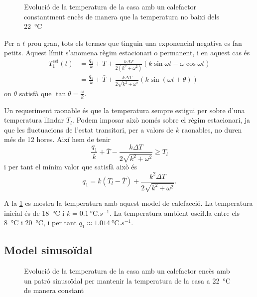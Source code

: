 \documentclass[12pt]{article}
\numberwithin{table}{section}
\numberwithin{figure}{section}
\numberwithin{equation}{section}
\begin{document}
\begin{figure}[htb]
	\small \sffamily \centering
	
	\caption{Evolució de la temperatura de la casa amb un calefactor constantment encès de manera que la temperatura no baixi dels \SI{22}{\celsius}}
	\label{fig:sol 1}
\end{figure}

Per a \( t \) prou gran, tots els termes que tinguin una exponencial negativa es fan petits. Aquest límit s'anomena règim estacionari o permanent, i en aquest cas és
\begin{equation} \label{eq:estacionari 1}
	\begin{aligned}
		T_1^\text{est} (t) & = \frac{q_1}{k} + \bar{T} + \frac{k\Delta T}{2(k^2 + \omega^2)}\left(k \sin{\omega t} - \omega \cos{\omega t}\right) \\
										 	 & = \frac{q_1}{k} + \bar{T} + \frac{k\Delta T}{2\sqrt{k^2 + \omega^2}}\left(k \sin{\left(\omega t + \theta\right)}\right)
	\end{aligned}
\end{equation}
on \( \theta \) satisfà que \( \tan{\theta} = \frac{\omega}{k} \). 

Un requeriment raonable és que la temperatura sempre estigui per sobre d'una temperatura llindar \( T_l \). Podem imposar això només sobre el règim estacionari, ja que les fluctuacions de l'estat transitori, per a valors de \( k \) raonables, no duren més de 12 hores. Així hem de tenir
\begin{equation*}
	\frac{q_1}{k} + \bar{T} - \frac{k\Delta T}{2\sqrt{k^2 + \omega^2}} \geq T_l
\end{equation*}
i per tant el mínim valor que satisfà això és 
\begin{equation*}
	q_1 = k\left(T_l - \bar{T}\right) + \frac{k^2 \Delta T}{2 \sqrt{k^2 + \omega^2}}. 
\end{equation*}

A la \cref{fig:sol 1} es mostra la temperatura amb aquest model de calefacció. La temperatura inicial és de \SI{18}{\celsius} i \( k = \SI{0.1}{\celsius.s^{-1}} \). La temperatura ambient osci\l.la entre els \SI{8}{\celsius} i \SI{20}{\celsius}, i per tant \( q_1 \approx \SI{1.014}{\celsius.s^{-1}} \). 

\subsection{Model sinusoïdal}
\begin{figure}[htb]
	\small \sffamily \centering
	
	\caption{Evolució de la temperatura de la casa amb un calefactor encès amb un patró sinusoïdal per mantenir la temperatura de la casa a \SI{22}{\celsius} de manera constant}
	\label{fig:sol 2}
\end{figure}
\end{document}
